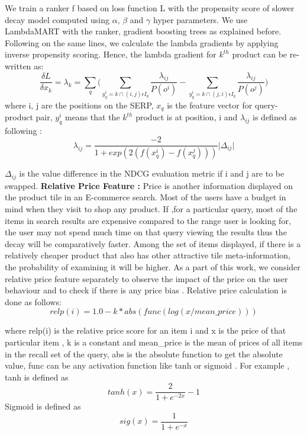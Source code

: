 \documentclass[11pt]{article}
\begin{document}
\newline
We train a ranker f based on loss function L with the propensity score of slower decay model computed using $\alpha$, $\beta$ and $\gamma$ hyper parameters. We use LambdaMART with the ranker, gradient boosting trees as explained before. Following on the same lines, we calculate the lambda gradients by applying inverse propensity scoring. Hence, the lambda gradient for $k^{th}$ product can be re-written as:
\begin{equation}
\frac{\delta L}{\delta x_k} = \lambda_k = \sum_q\Bigg(\sum_{y_q^{i}=k\cap(i,j)\epsilon I_q} \frac{\lambda_{ij}}{P(o^i)} - \sum_{y_q^{i}=k\cap(j,i)\epsilon I_q} \frac{\lambda_{ij}}{P(o^j)}\Bigg)
\end{equation}
\newline
where i, j are the positions on the SERP, $x_q$ is the feature vector for query-product pair, $y_q^{i}$ means that the $k^{th}$ product is at position, i
and $\lambda_{ij}$ is defined as following :
\[\lambda_{ij}=\frac{-2}{1+exp(2(f(x_q^i)-f(x_q^j)))}\big|\Delta_{ij}\big|\]

$\Delta_{ij}$ is the value difference in the NDCG evaluation metric if i and j are to be swapped.
\newline
\newline
\textbf{Relative Price Feature : }
Price is another information displayed on the product tile in an E-commerce search. Most of the users have a budget in mind when they visit to shop any product. If ,for a particular query, most of the items in search results are expensive compared to the range user is looking for, the user may not spend much time on that query viewing the results thus the decay will be comparatively faster. Among the set of items displayed, if there is a relatively cheaper product that also has other attractive tile meta-information, the probability of examining it will be higher. 
As a part of this work, we consider relative price feature separately to observe the impact of the price on the user behaviour and to check if there is any price bias . Relative price calculation is done as follows: 
\begin{equation}
relp(i) = 1.0 - k * abs(func( log(x/mean\_price)))
\end{equation}

where relp(i) is the relative price score for an item i and x is the price of that particular item , k is a constant and mean\_price is the mean of prices of all items in the recall set of the query, abs is the absolute function to get the absolute value, func can be any activation function\cite{act} like tanh or sigmoid . For example , tanh is defined as 
\[tanh(x) = \frac{2}{1 + e^{-2x}} -1 \]
Sigmoid is defined as
\[sig(x) = \frac{1}{1 + e^{-x}} \]
\end{document}
